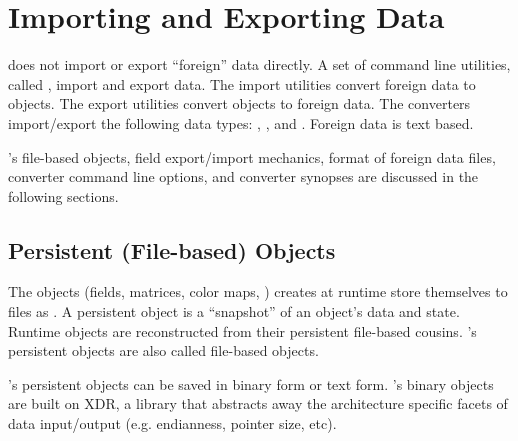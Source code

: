 %
%
%
%
%

\section{Importing and Exporting \sr{} Data}
\label{sec:import_export} 

\sr{} does not import or export ``foreign'' data directly. A set of
command line utilities, called , import and export
data.  The import utilities convert foreign data to \sr{}  
objects.  The export utilities convert \sr{} objects to
foreign data. The converters import/export the following \sr{} data
types: , , and .
Foreign data is text based.

\sr{}'s file-based objects, field export/import mechanics, format of
foreign data files, converter command line options, and converter
synopses are discussed in the following sections.


\subsection{\sr{} Persistent (File-based) Objects}
\label{sec:sr_file_object}

The objects (fields, matrices, color maps, \etc) \sr{} creates at runtime
store themselves to files as .  A persistent
object is a ``snapshot'' of an object's data and state.  Runtime
objects are reconstructed from their persistent file-based cousins.
\sr{}'s persistent objects are also called \sr{} file-based objects.

\sr{}'s persistent objects can be saved in binary form or text form.
\sr{}'s binary objects are built on XDR, a library that abstracts
away the architecture specific facets of data input/output (e.g.
endianness, pointer size, etc).


